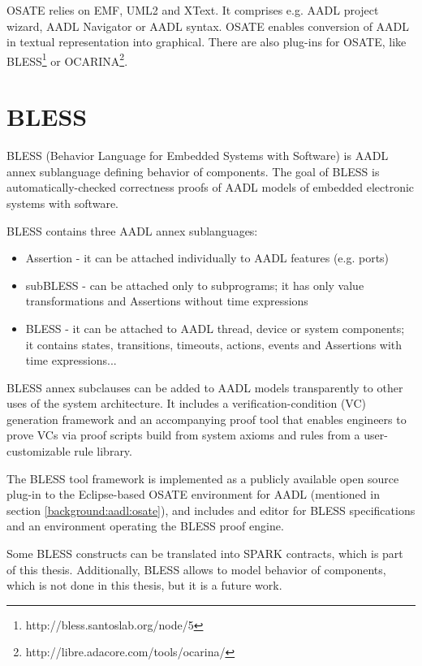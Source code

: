 OSATE relies on EMF, UML2 and XText. It comprises e.g. AADL project wizard, AADL Navigator or AADL syntax. OSATE enables conversion of AADL in textual representation into graphical. There are also plug-ins for OSATE, like BLESS\footnote{http://bless.santoslab.org/node/5} or OCARINA\footnote{http://libre.adacore.com/tools/ocarina/}.



\section{BLESS}
\label{background:bless}
BLESS (Behavior Language for Embedded Systems with Software) is AADL annex sublanguage defining behavior of components. The goal of BLESS is automatically-checked correctness proofs of AADL models of embedded electronic systems with software.

BLESS contains three AADL annex sublanguages:
\begin{itemize} \itemsep1pt \parskip0pt 
	\item Assertion - it can be attached individually to AADL features (e.g. ports)
	\item subBLESS - can be attached only to subprograms; it has only value transformations and Assertions without time expressions
	\item BLESS - it can be attached to AADL thread, device or system components; it contains states, transitions, timeouts, actions, events and Assertions with time expressions...
\end{itemize}

BLESS annex subclauses can be added to AADL models transparently to other uses of the system architecture. It includes a verification-condition (VC) generation framework and an accompanying proof tool that enables engineers to prove VCs via proof scripts build from system axioms and rules from a user-customizable rule library. \cite{Bless:Paper}

The BLESS tool framework is implemented as a publicly available open source plug-in to the Eclipse-based OSATE environment for AADL (mentioned in section \ref{background:aadl:osate}), and includes and editor for BLESS specifications and an environment operating the BLESS proof engine. \cite{Bless:Paper}

Some BLESS constructs can be translated into SPARK contracts, which is part of this thesis. Additionally, BLESS allows to model behavior of components, which is not done in this thesis, but it is a future work.

